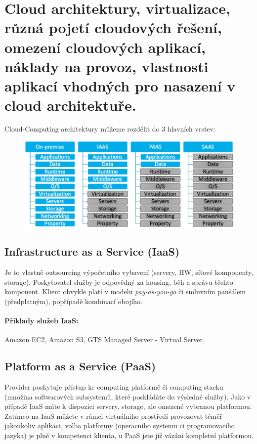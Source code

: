 \setcounter{section}{18}
\section[WA2 - Cloud]{Cloud architektury, virtualizace, různá pojetí cloudových řešení, omezení cloudových aplikací, náklady na provoz, vlastnosti aplikací vhodných pro nasazení v cloud architektuře.}

Cloud-Computing architektury můžeme rozdělit do 3 hlavních vrstev:

\begin{figure}[h!]
\centering
\includegraphics[width=140mm]{19/images/cloud-types}
\end{figure}

\subsection{Infrastructure as a Service (IaaS)}
Je to vlastně outsourcing výpočetního vybavení (servery, HW, síťové komponenty, storage). Poskytovatel služby je odpovědný za housing, běh a správu těchto komponent. Klient obvykle platí v modelu \textit{pay-as-you-go} či smluvním paušálem (předplatným), popřípadě kombinací obojího.
\paragraph{Příklady služeb IaaS:} Amazon EC2, Amazon S3, GTS Managed Server - Virtual Server.

\subsection{Platform as a Service (PaaS)}
Provider poskytuje přístup ke computing platformě či computing stacku (množina softwarových subsystemů, které poskládáte do výsledné služby). Jako v případě IaaS máte k dispozici servery, storage, ale omezené vybranou platformou. Zatímco na IaaS můžete v rámci virtuálního prostředí provozovat téměř jakoukoliv aplikaci, volba platformy (operacniho systemu ci programovaciho jazyka) je plně v kompetenci klienta, u PaaS jste již vázáni kompletní platformou.

